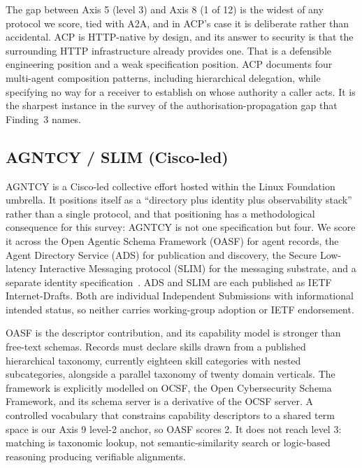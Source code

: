 The gap between Axis 5 (level 3) and Axis 8 (1 of 12) is the
widest of any protocol we score, tied with A2A, and in ACP's
case it is deliberate rather
than accidental. ACP is HTTP-native by design, and its
answer to security is that the surrounding HTTP
infrastructure already provides one. That is a defensible
engineering position and a weak specification position. ACP
documents four multi-agent composition patterns, including
hierarchical delegation, while specifying no way for a
receiver to establish on whose authority a caller acts. It
is the sharpest instance in the survey of the
authorisation-propagation gap that Finding~3 names.

\subsection{AGNTCY / SLIM (Cisco-led)}
\label{sec:industry:agntcy}

AGNTCY is a Cisco-led collective effort hosted within the
Linux Foundation umbrella. It positions itself as a
``directory plus identity plus observability stack'' rather
than a single protocol, and that positioning has a
methodological consequence for this survey: AGNTCY is not
one specification but four. We score it across the Open
Agentic Schema Framework (OASF) for agent records, the
Agent Directory Service (ADS) for publication and
discovery, the Secure Low-latency Interactive Messaging
protocol (SLIM) for the messaging substrate, and a separate
identity specification~\cite{spec_agntcy}. ADS and SLIM are
each published as IETF Internet-Drafts. Both are individual
Independent Submissions with informational intended status,
so neither carries working-group adoption or IETF
endorsement.

OASF is the descriptor contribution, and its capability
model is stronger than free-text schemas. Records must
declare skills drawn from a published hierarchical
taxonomy, currently eighteen skill categories with nested
subcategories, alongside a parallel taxonomy of twenty
domain verticals. The framework is explicitly modelled on
OCSF, the Open Cybersecurity Schema Framework, and its
schema server is a derivative of the OCSF server. A
controlled vocabulary that constrains capability
descriptors to a shared term space is our Axis 9 level-2
anchor, so OASF scores 2. It does not reach level 3:
matching is taxonomic lookup, not semantic-similarity
search or logic-based reasoning producing verifiable
alignments.

